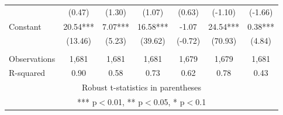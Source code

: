 \documentclass[]{article}
\begin{document}
\begin{tabular}{lcccccc}
 & (0.47) & (1.30) & (1.07) & (0.63) & (-1.10) & (-1.66) \\
Constant & 20.54*** & 7.07*** & 16.58*** & -1.07 & 24.54*** & 0.38*** \\
 & (13.46) & (5.23) & (39.62) & (-0.72) & (70.93) & (4.84) \\
 &  &  &  &  &  &  \\
Observations & 1,681 & 1,681 & 1,681 & 1,679 & 1,679 & 1,681 \\
 R-squared & 0.90 & 0.58 & 0.73 & 0.62 & 0.78 & 0.43 \\ \hline
\multicolumn{7}{c}{ Robust t-statistics in parentheses} \\
\multicolumn{7}{c}{ *** p$<$0.01, ** p$<$0.05, * p$<$0.1} \\
\end{tabular}
\end{document}
